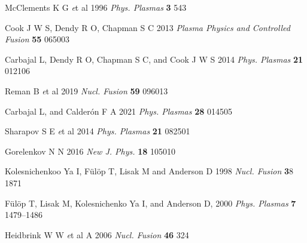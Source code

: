 \documentclass[12pt]{iopart}
\begin{document}
\begin{thebibliography}{9}
McClements K G {\textit et al} 1996 \textit{Phys. Plasmas} \textbf{3} 543

Cook J W S, Dendy R O, Chapman S C 2013 \textit{Plasma Physics and Controlled Fusion} \textbf{55} 065003

Carbajal L, Dendy R O, Chapman S C, and Cook J W S 2014 \textit{Phys. Plasmas} \textbf{21} 012106

Reman B {\textit et al} 2019 \textit{Nucl. Fusion} \textbf{59} 096013

Carbajal L, and Calderón F A 2021 \textit{Phys. Plasmas} \textbf{28} 014505

Sharapov S E {\textit et al} 2014 \textit{Phys. Plasmas} \textbf{21} 082501

Gorelenkov N N 2016 \textit{New J. Phys.} \textbf{18} 105010

Kolesnichenkoo Ya I, F{\"u}l{\"o}p T, Lisak M and Anderson D 1998 \textit{Nucl. Fusion} {\textbf 38} 1871

F{\"u}l{\"o}p T, Lisak M, Kolesnichenko Ya I, and Anderson D, 2000 \textit{Phys. Plasmas} \textbf{7} 1479–1486

Heidbrink W W {\textit et al} A 2006 \textit{Nucl. Fusion} \textbf{46} 324


\end{thebibliography}
\end{document}
